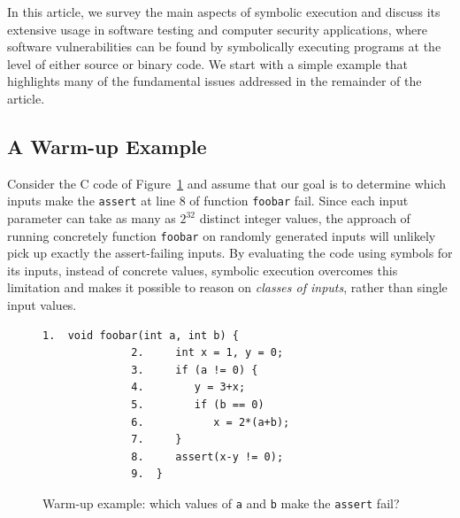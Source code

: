 
In this article, we survey the main aspects of symbolic execution and discuss its extensive usage in software testing and computer security applications, where software vulnerabilities can be found by symbolically executing programs at the level of either source or binary code. We start with a simple example that highlights many of the fundamental issues addressed in the remainder of the article.

\subsection{A Warm-up Example}
\label{symbolic-execution-example}

Consider the C code of Figure~\ref{fig:example-1} and assume that our goal is to determine which inputs make the  {\tt assert} at line 8 of function \texttt{foobar} fail. Since each input parameter can take as many as $2^{32}$ distinct integer values, the approach of running concretely function \texttt{foobar} on randomly generated inputs will unlikely pick up exactly the assert-failing inputs.
By evaluating the code using symbols for its inputs, instead of concrete values, symbolic execution overcomes this limitation and makes it possible to reason on {\em classes of inputs}, rather than single input values. 

\begin{figure}[t]
\begin{lstlisting}[basicstyle=\ttfamily\small]
              1.  void foobar(int a, int b) {
              2.     int x = 1, y = 0;
              3.     if (a != 0) {
              4.        y = 3+x;
              5.        if (b == 0)
              6.           x = 2*(a+b);
              7.     }
              8.     assert(x-y != 0);
              9.  }
\end{lstlisting}
\caption{Warm-up example: which values of \texttt{a} and \texttt{b} make the \texttt{assert} fail?}
\label{fig:example-1}
\end{figure}

